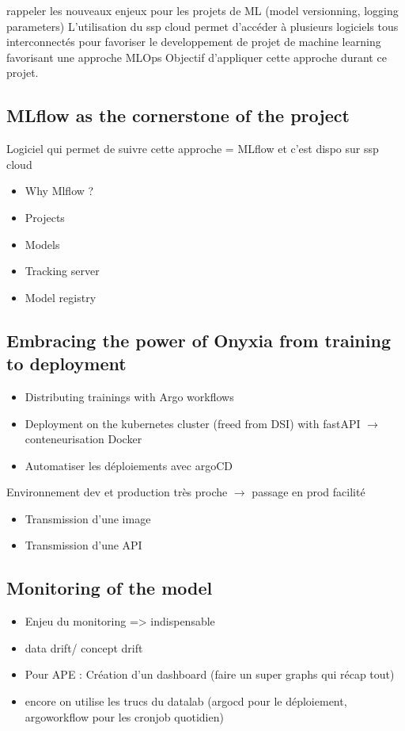 rappeler les nouveaux enjeux pour les projets de ML (model versionning, logging parameters) 
L'utilisation du ssp cloud permet d'accéder à plusieurs logiciels tous interconnectés pour favoriser le developpement de projet de machine learning favorisant une approche MLOps
Objectif d'appliquer cette approche durant ce projet.

\subsection{MLflow as the cornerstone of the project}

Logiciel qui permet de suivre cette approche = MLflow et c'est dispo sur ssp cloud

\begin{itemize}
    \item Why Mlflow ?
    \item Projects
    \item Models
    \item Tracking server
    \item Model registry
\end{itemize}

\subsection{Embracing the power of Onyxia from training to deployment}

\begin{itemize}
    \item Distributing trainings with Argo workflows
    \item Deployment on the kubernetes cluster (freed from DSI) with fastAPI  $\rightarrow$ conteneurisation Docker
    \item Automatiser les déploiements avec argoCD
\end{itemize}

Environnement dev et production très proche $\rightarrow$ passage en prod facilité
\begin{itemize}
    \item Transmission d'une image
    \item Transmission d'une API
\end{itemize}

\subsection{Monitoring of the model}

\begin{itemize}
    \item Enjeu du monitoring => indispensable
    \item data drift/ concept drift
    \item Pour APE : Création d'un dashboard (faire un super graphs qui récap tout)
    \item encore on utilise les trucs du datalab (argocd pour le déploiement, argoworkflow pour les cronjob quotidien)
\end{itemize}

